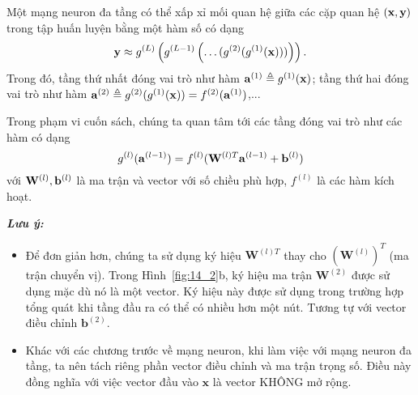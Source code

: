 
Một mạng neuron đa tầng có thể xấp xỉ mối quan hệ giữa
các cặp quan hệ $(\mathbf{x}, \mathbf{y})$ trong tập huấn luyện bằng một hàm số có dạng
\begin{equation}
\mathbf{y} \approx g^{(L)}\left(g^{(L-1)}\left(\dots
(g^{(2)}(g^{(1)}(\mathbf{x})))\right)\right).
\end{equation}
Trong đó, tầng thứ nhất đóng vai trò như hàm $\mathbf{a}^{(1)} \triangleq
g^{(1)}(\mathbf{x})$;
tầng thứ hai đóng vai trò như hàm $\mathbf{a}^{(2)} \triangleq g^{(2)}(g^{(1)}(\mathbf{x})) =
f^{(2)}(\mathbf{a}^{(1)})$,...

Trong phạm vi cuốn sách, chúng ta quan tâm tới các tầng đóng vai trò như các
hàm có dạng
\begin{equation}
g^{(l)}(\mathbf{a}^{(l-1)}) = f^{(l)}(\mathbf{W}^{(l)T}\mathbf{a}^{(l-1)} + \mathbf{b}^{(l)})
\end{equation}
với $\mathbf{W}^{(l)}, \mathbf{b}^{(l)}$ là ma trận và vector với số chiều phù hợp, $f^{(l)}$
là các hàm kích hoạt.

\textbf{\textit{Lưu ý:}} \begin{itemize}



\item Để đơn giản hơn, chúng ta sử dụng ký hiệu $\mathbf{W}^{(l)T}$ thay
cho $(\mathbf{W}^{(l)})^T$ (ma trận chuyển vị). Trong Hình~\ref{fig:14_2}b,
ký hiệu ma trận $\mathbf{W}^{(2)}$ được sử dụng mặc dù nó là một
vector. Ký hiệu này được sử dụng trong trường hợp tổng quát khi tầng đầu ra có thể có nhiều hơn một nút. Tương tự với vector điều chỉnh $\mathbf{b}^{(2)}$.

\item Khác với các chương trước về mạng neuron, khi làm việc với
mạng neuron đa tầng, ta nên tách riêng phần vector điều chỉnh và ma trận trọng số. Điều này đồng nghĩa với việc vector đầu vào $\mathbf{x}$ là vector KHÔNG mở rộng.
\end{itemize}

